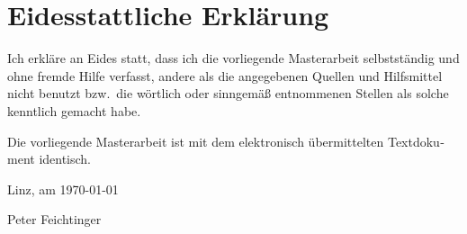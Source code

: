 \chapter*{Eidesstattliche Erklärung}
\begin{otherlanguage}{ngerman}

Ich erkläre an Eides statt, dass ich die vorliegende Masterarbeit selbstständig und ohne fremde Hilfe verfasst, andere 
als die angegebenen Quellen und Hilfsmittel nicht benutzt bzw.\ die wörtlich oder sinngemäß entnommenen Stellen als 
solche kenntlich gemacht habe.

Die vorliegende Masterarbeit ist mit dem elektronisch übermittelten Textdokument identisch.


Linz, am \today

\vspace{3em}
\hfill Peter Feichtinger

\end{otherlanguage}
